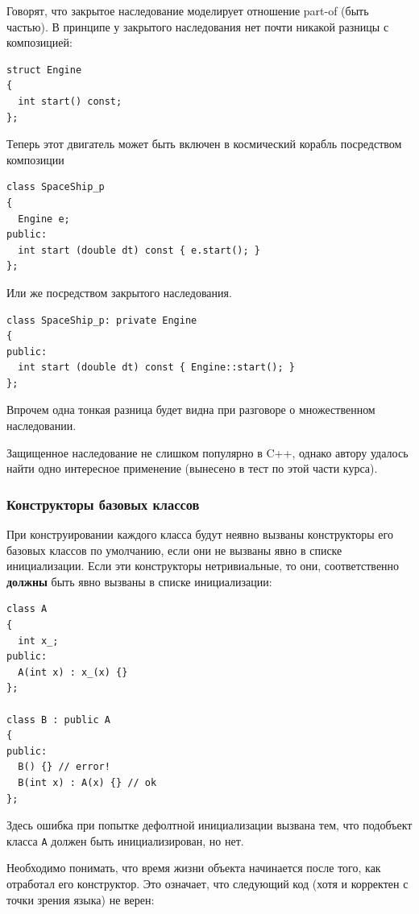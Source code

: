 \documentclass[a4paper,12pt,oneside]{article}
\begin{document}
Говорят, что закрытое наследование моделирует отношение part-of (быть частью). В принципе у закрытого наследования нет почти никакой разницы с композицией:

\begin{lstlisting}
struct Engine
{
  int start() const;
};
\end{lstlisting}

Теперь этот двигатель может быть включен в космический корабль посредством композиции

\begin{lstlisting}
class SpaceShip_p
{
  Engine e;
public:
  int start (double dt) const { e.start(); } 
};
\end{lstlisting}

Или же посредством закрытого наследования.

\begin{lstlisting}
class SpaceShip_p: private Engine
{
public:
  int start (double dt) const { Engine::start(); }
};
\end{lstlisting}

Впрочем одна тонкая разница будет видна при разговоре о множественном наследовании.

Защищенное наследование не слишком популярно в C++, однако автору удалось найти одно интересное применение (вынесено в тест по этой части курса).

\subsubsection{Конструкторы базовых классов}\label{BaseClassConstr}

При конструировании каждого класса будут неявно вызваны конструкторы его базовых классов по умолчанию, если они не вызваны явно в списке инициализации. Если эти конструкторы нетривиальные, то они, соответственно \textbf{должны} быть явно вызваны в списке инициализации:

\begin{lstlisting}
class A
{
  int x_;
public:
  A(int x) : x_(x) {}
};

class B : public A
{
public:
  B() {} // error!
  B(int x) : A(x) {} // ok
};
\end{lstlisting}

Здесь ошибка при попытке дефолтной инициализации вызвана тем, что подобъект класса \lstinline!A! должен быть инициализирован, но нет.

Необходимо понимать, что время жизни объекта начинается после того, как отработал его конструктор. Это означает, что следующий код (хотя и корректен с точки зрения языка) не верен:
\end{document}
